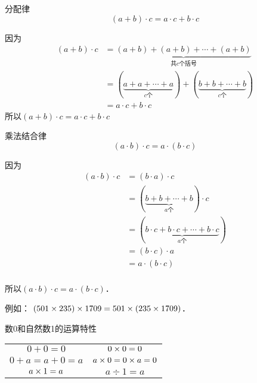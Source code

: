 \begin{blk}{分配律}
    \[(a+b)\cdot c=a\cdot c+b\cdot c \]
    \end{blk}
\begin{note}
    因为
\begin{align*}
    (a+b)\cdot c&=\underbrace{(a+b)+(a+b)+\cdots+(a+b)}_{\text{共$c$个括号}} \tag{乘法的意义}\\
    &=(\underbrace{a+a+\cdots+a}_{c\text{个}})+(\underbrace{b+b+\cdots +b}_{c\text{个}})\tag{加法结合律与交换律}\\
    &=a\cdot c+b\cdot c   \tag{乘法的意义} 
\end{align*}
所以$(a+b)\cdot c=a\cdot c+b\cdot c $
\end{note}


\begin{blk}{乘法结合律}
    \[(a\cdot b)\cdot c=a\cdot (b\cdot c) \]
    \end{blk}

\begin{note}
    因为
    \begin{align*}
        (a\cdot b)\cdot c&=(b\cdot a)\cdot c \tag{乘法交换律}\\
        &=(\underbrace{b+b+\cdots +b}_{a\text{个}})\cdot c \tag{乘法的意义}\\
        &=(\underbrace{b\cdot c+b\cdot c+\cdots +b\cdot c}_{a\text{个}})  \tag{分配律} \\
        &=(b\cdot c)\cdot a \tag{乘法的意义}\\
        &=a\cdot (b\cdot c) \tag{乘法交换律}\\
    \end{align*}

    所以$(a\cdot b)\cdot c=a\cdot (b\cdot c)$．

    例如：  $(501\times   235) \times 1709=501\times    (235 \times 1709)$．    
\end{note}
    
\begin{blk}{数0和自然数1的运算特性}
    \begin{center}
        \begin{tabular}{cc}
        $0+0=0$   &   $0\times 0=0$\\
        $0+a=a+0=a$   &   $a\times 0=0\times a=0$\\
        $a\times 1=a$   &   $a\div 1=a$\\       
        \end{tabular}     
    \end{center}
\end{blk}

